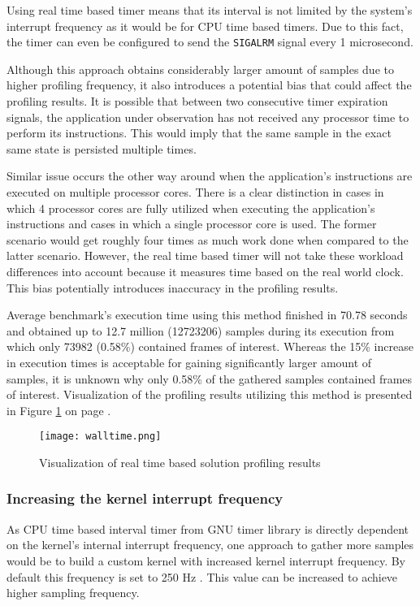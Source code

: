 \documentclass[..thesis.tex]{subfiles}
\begin{document}
Using real time based timer means that its interval is not limited by the system's interrupt frequency as it would be for CPU time based timers. Due to this fact, the timer can even be configured to send the \texttt{SIGALRM} signal every 1 microsecond.

Although this approach obtains considerably larger amount of samples due to higher profiling frequency, it also introduces a potential bias that could affect the profiling results. It is possible that between two consecutive timer expiration signals, the application under observation has not received any processor time to perform its instructions. This would imply that the same sample in the exact same state is persisted multiple times. 

Similar issue occurs the other way around when the application's instructions are executed on multiple processor cores. There is a clear distinction in cases in which 4 processor cores are fully utilized when executing the application's instructions and cases in which a single processor core is used. The former scenario would get roughly four times as much work done when compared to the latter scenario. However, the real time based timer will not take these workload differences into account because it measures time based on the real world clock. This bias potentially introduces inaccuracy in the profiling results.

Average benchmark's execution time using this method finished in 70.78 seconds and obtained up to 12.7 million (12723206) samples during its execution from which only 73982 (0.58\%) contained frames of interest. Whereas the 15\% increase in execution times is acceptable for gaining significantly larger amount of samples, it is unknown why only 0.58\% of the gathered samples contained frames of interest. Visualization of the profiling results utilizing this method is presented in Figure \ref{fig:walltime} on page \pageref{fig:walltime}.
\begin{figure}[H]
\texttt{[image: walltime.png]}
\caption{Visualization of real time based solution profiling results}
\label{fig:walltime}
\end{figure}

\subsubsection{Increasing the kernel interrupt frequency}
\label{kernel-clock}
As CPU time based interval timer from GNU timer library is directly dependent on the kernel's internal interrupt frequency, one approach to gather more samples would be to build a custom kernel with increased kernel interrupt frequency. By default this frequency is set to 250 Hz \cite{torvalds_linux:_2018}. This value can be increased to achieve higher sampling frequency. 
\end{document}

